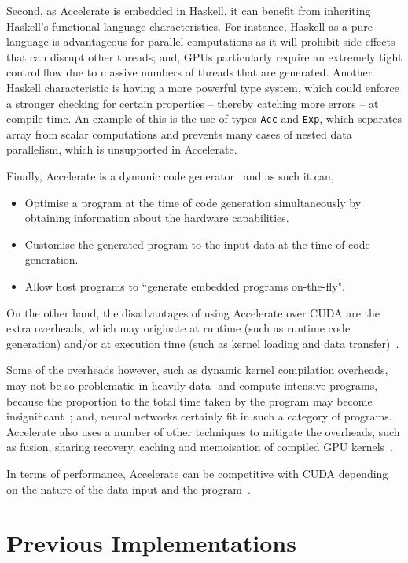 Second, as Accelerate is embedded in Haskell, it can benefit from inheriting Haskell's functional language characteristics. For instance, Haskell as a pure language is advantageous for parallel computations as it will prohibit side effects that can disrupt other threads; and, GPUs particularly require an extremely tight control flow due to massive numbers of threads that are generated. Another Haskell characteristic is having a more powerful type system, which could enforce a stronger checking for certain properties -- thereby catching more errors -- at compile time. An example of this is the use of types \texttt{Acc} and \texttt{Exp}, which separates array from scalar computations and prevents many cases of nested data parallelism, which is unsupported in Accelerate.

Finally, Accelerate is a dynamic code generator~\cite{ChaKelLee11} and as such it can,
\begin{itemize}
\item Optimise a program at the time of code generation simultaneously by obtaining information about the hardware capabilities.
\item Customise the generated program to the input data at the time of code generation.
\item Allow host programs to ``generate embedded programs on-the-fly".
\end{itemize}

On the other hand, the disadvantages of using Accelerate over CUDA are the extra overheads, which may originate at runtime (such as runtime code generation) and/or at execution time (such as kernel loading and data transfer)~\cite{ChaKelLee11}. 

Some of the overheads however, such as dynamic kernel compilation overheads, may not be so problematic in heavily data- and compute-intensive programs, because the proportion to the total time taken by the program may become insignificant~\cite{ChaKelLee11}; and, neural networks certainly fit in such a category of programs. Accelerate also uses a number of other techniques to mitigate the overheads, such as fusion, sharing recovery, caching and memoisation of compiled GPU kernels~\cite{ChaKelLee11}.

In terms of performance, Accelerate can be competitive with CUDA depending on the nature of the data input and the program~\cite{McDChaKel13}. 

\section{Previous Implementations} \label{se:previmplem}

